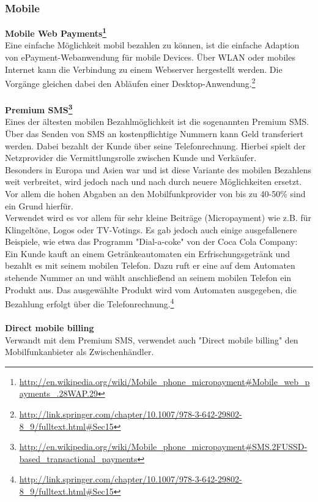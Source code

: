 \subsubsection{Mobile}
\textbf{Mobile Web Payments\footnote{\url{http://en.wikipedia.org/wiki/Mobile_phone_micropayment\#Mobile_web_payments_.28WAP.29}}}\\
Eine einfache Möglichkeit mobil bezahlen zu können, ist die einfache Adaption von ePayment-Webanwendung für mobile Devices. Über WLAN oder mobiles Internet kann die Verbindung zu einem Webserver hergestellt werden. Die Vorgänge gleichen dabei den Abläufen einer Desktop-Anwendung.\footnote{\url{http://link.springer.com/chapter/10.1007/978-3-642-29802-8_9/fulltext.html\#Sec15}}\\
\\
\textbf{Premium SMS\footnote{\url{http://en.wikipedia.org/wiki/Mobile_phone_micropayment\#SMS.2FUSSD-based_transactional_payments}}}\\
Eines der ältesten mobilen Bezahlmöglichkeit ist die sogenannten Premium SMS. Über das Senden von SMS an kostenpflichtige Nummern kann Geld transferiert werden. Dabei bezahlt der Kunde über seine Telefonrechnung. Hierbei spielt der Netzprovider die Vermittlungsrolle zwischen Kunde und Verkäufer.\\
Besonders in Europa und Asien war und ist diese Variante des mobilen Bezahlens weit verbreitet, wird jedoch nach und nach durch neuere Möglichkeiten ersetzt. Vor allem die hohen Abgaben an den Mobilfunkprovider von bis zu 40-50\% sind ein Grund hierfür.\\
Verwendet wird es vor allem für sehr kleine Beiträge (Micropayment) wie z.B. für Klingeltöne, Logos oder TV-Votings. Es gab jedoch auch einige ausgefallenere Beispiele, wie etwa das Programm "Dial-a-coke" von der Coca Cola Company: Ein Kunde kauft an einem Getränkeautomaten ein Erfrischungsgetränk und bezahlt es mit seinem mobilen Telefon. Dazu ruft er eine auf dem Automaten stehende Nummer an und wählt anschließend an seinem mobilen Telefon ein Produkt aus. Das ausgewählte Produkt wird vom Automaten ausgegeben, die Bezahlung erfolgt über die Telefonrechnung.\footnote{\url{http://link.springer.com/chapter/10.1007/978-3-642-29802-8_9/fulltext.html\#Sec15}}\\
\\
\textbf{Direct mobile billing}\\
Verwandt mit dem Premium SMS, verwendet auch "Direct mobile billing" den Mobilfunkanbieter als Zwischenhändler.\\
